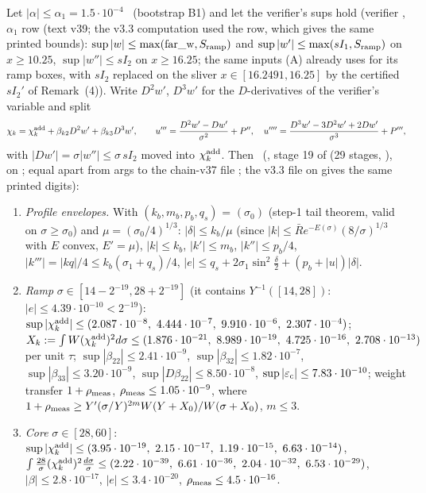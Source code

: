 \begin{lemma}\label{C:lem:bd}
Let $|\alpha|\le\alpha_1=1.5\cdot10^{-4}$ \tH\ (bootstrap B1) and let the verifier's sups hold (verifier , $\alpha_1$ row (text v39; the v3.3 computation used the  row, which gives the same printed bounds): $\sup|w|\le\max(\mathrm{far\_w},S_{\rm ramp})$ and $\sup|w'|\le\max(sI_1,S_{\rm ramp})$ on $x\ge10.25$, $\sup|w''|\le sI_2$ on $x\ge16.25$; the same inputs (A) already uses for its ramp boxes, with $sI_2$ replaced on the sliver $x\in[16.2491,16.25]$ by the certified $sI_2'$ of Remark~(4)). Write $D^2w'$, $D^3w'$ for the $D$-derivatives of the verifier's variable and split
\[
\chi_k=\chi_k^{\rm add}+\beta_{k2}D^2w'+\beta_{k3}D^3w',\qquad u'''=\frac{D^2w'-Dw'}{\sigma^2}+P'',\quad u''''=\frac{D^3w'-3D^2w'+2Dw'}{\sigma^3}+P''' ,
\]
with $|Dw'|=\sigma|w''|\le\sigma\,sI_2$ moved into $\chi^{\rm add}_k$. Then \tC\ (, stage 19 of  (29 stages, ), on ; equal apart from args to the chain-v37 file ; the v3.3 file  on  gives the same printed digits):
\begin{enumerate}
\item[(i)] \emph{Profile envelopes.} With $(k_b,m_b,p_b,q_s)$ = $(\sigma_0)$ (step-1 tail theorem, valid on $\sigma\ge\sigma_0$) and $\mu=(\sigma_0/4)^{1/3}$: $|\delta|\le k_b/\mu$ (since $|k|\le\bar R e^{-E(\sigma)}(8/\sigma)^{1/3}$ with $E$ convex, $E'=\mu$), $|k|\le k_b$, $|k'|\le m_b$, $|k''|\le p_b/4$, $|k'''|=|kq|/4\le k_b(\sigma_1+q_s)/4$, $|e|\le q_s+2\sigma_1\sin^2\frac\delta2+(p_b+|u|)|\delta|$.
\item[(ii)] \emph{Ramp} $\sigma\in[14-2^{-19},28+2^{-19}]$ (it contains $Y^{-1}([14,28])$: $|e|\le4.39\cdot10^{-10}<2^{-19}$):
$\sup|\chi^{\rm add}_k|\le(2.087\cdot10^{-8},\ 4.444\cdot10^{-7},\ 9.910\cdot10^{-6},\ 2.307\cdot10^{-4})$;
$X_k:=\int W(\chi^{\rm add}_k)^2d\sigma\le(1.876\cdot10^{-21},\ 8.989\cdot10^{-19},\ 4.725\cdot10^{-16},\ 2.708\cdot10^{-13})$ per unit $\tau$;
$\sup|\beta_{22}|\le2.41\cdot10^{-9}$, $\sup|\beta_{32}|\le1.82\cdot10^{-7}$, $\sup|\beta_{33}|\le3.20\cdot10^{-9}$, $\sup|D\beta_{22}|\le8.50\cdot10^{-8}$, $\sup|\varepsilon_{\rm c}|\le7.83\cdot10^{-10}$; weight transfer $1+\rho_{\rm meas}$, $\rho_{\rm meas}\le1.05\cdot10^{-9}$, where $1+\rho_{\rm meas}\ge Y'(\sigma/Y)^{2m}W(Y+X_0)/W(\sigma+X_0)$, $m\le3$.
\item[(iii)] \emph{Core} $\sigma\in[28,60]$: $\sup|\chi^{\rm add}_k|\le(3.95\cdot10^{-19},\ 2.15\cdot10^{-17},\ 1.19\cdot10^{-15},\ 6.63\cdot10^{-14})$, $\int\frac{28}\sigma(\chi^{\rm add}_k)^2\frac{d\sigma}\sigma\le(2.22\cdot10^{-39},\ 6.61\cdot10^{-36},\ 2.04\cdot10^{-32},\ 6.53\cdot10^{-29})$, $|\beta|\le2.8\cdot10^{-17}$, $|e|\le3.4\cdot10^{-20}$, $\rho_{\rm meas}\le4.5\cdot10^{-16}$.

\end{enumerate}
\end{lemma}
